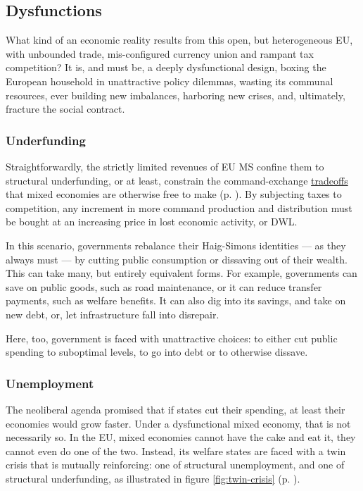 \documentclass[11pt,a4paper,oneside,openright]{article}
\begin{document}
\subsection{Dysfunctions} \label{sec:defunct} What kind of an economic reality results from this open, but heterogeneous \gls{EU}, with unbounded trade, mis-configured currency union and rampant tax competition? 
It is, and must be, a deeply dysfunctional design, boxing the European household in unattractive policy dilemmas, wasting its communal resources, ever building new imbalances, harboring new crises, and, ultimately, fracture the social contract.

\subsubsection{Underfunding} \label{sec:public-squalor} Straightforwardly, the strictly limited revenues of \gls{EU} \gls{MS} confine them to structural underfunding, or at least, constrain the command-exchange \hyperref[sec:tradeoffs]{tradeoffs} that mixed economies are otherwise free to make (p. \pageref{sec:tradeoffs}). %
By subjecting taxes to competition, any increment in more command production and distribution must be bought at an increasing price in lost economic activity, or \gls{DWL}. 

In this scenario, governments rebalance their Haig-Simons identities --- as they always must --- by cutting public consumption or dissaving out of their wealth. 
This can take many, but entirely equivalent forms. 
For example, governments can save on public goods, such as road maintenance, or it can reduce transfer payments, such as welfare benefits. 
It can also dig into its savings, and take on new debt, or, let infrastructure fall into disrepair.

Here, too, government is faced with unattractive choices: 
to either cut public spending to suboptimal levels, to go into debt or to otherwise dissave.


\subsubsection{Unemployment}
The neoliberal agenda promised that if states cut their spending, at least their economies would grow faster. 
Under a dysfunctional mixed economy, that is not necessarily so. 
In the \gls{EU}, mixed economies cannot have the cake and eat it, they cannot even do one of the two. 
Instead, its welfare states are faced with a twin crisis that is mutually reinforcing: 
one of structural unemployment, and one of structural underfunding, as illustrated in figure \ref{fig:twin-crisis} (p. \pageref{fig:twin-crisis}). 
\end{document}
